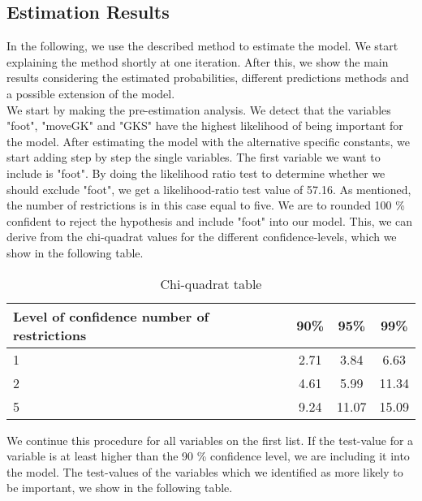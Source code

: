 \documentclass[12pt,dvipsnames]{article}%
\begin{document}
\subsection{Estimation Results}

In the following, we use the described method to estimate the model. We
start explaining the method shortly at one iteration. After this, we show the main results considering the estimated probabilities, different predictions methods and a possible extension of the model. \\
%
We start by making the pre-estimation analysis. We detect that the variables "foot", "moveGK" and "GKS" have the highest likelihood of being important for the model. After estimating the model with the alternative specific constants, we start adding step by step the single variables. The first variable we want to include is "foot". By doing the likelihood ratio test to determine whether we should exclude "foot", we get a likelihood-ratio test value of 57.16. As mentioned, the number of restrictions is in this case equal to five. We are to rounded 100 \% confident to reject the hypothesis and include "foot" into our model. This, we can derive from the chi-quadrat values for the different confidence-levels, which we show in the following table.

 \begin{table}[ht]
\caption{Chi-quadrat table}
\centering
\small
\begin{tabular}{ p{3.65cm} |  c |  c |  c }
   Level of confidence number of restrictions & 90\%  & 95\% & 99\%  \\
   \hline

1    &   2.71   & 3.84     & 6.63   \\

2    &  4.61  & 5.99       & 11.34  \\

5    &   9.24   & 11.07    & 15.09  \\

 \end{tabular}
 \end{table}
 
We continue this procedure for all variables on the first list. If the test-value for a variable is at least higher than the 90 \% confidence level, we are including it into the model. The test-values of the variables which we identified as more likely to be important, we show in the following table.
\end{document}
